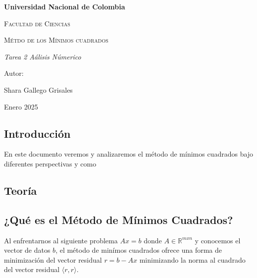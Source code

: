 \documentclass[12pt]{article}
\begin{document}
\begin{titlepage}
\centering
{\bfseries\LARGE Universidad Nacional de Colombia \par}
\vspace{1cm}
{\scshape\Large Facultad de Ciencias \par}
\vspace{3cm}
{\scshape\Huge M\'etdo de los M\'inimos cuadrados\par}
\vspace{3cm}
{\itshape\Large Tarea 2 
A\'alisis N\'umerico\par}
\vfill
{\Large Autor: \par}
{\Large Shara Gallego Grisales \par}
\vfill
{\Large Enero 2025 \par}
\end{titlepage}

\tableofcontents
\vspace{25.0cm}

\begin{center}
\section{Introducci\'on}
\end{center}

\vspace{0.5cm }
En este documento veremos y analizaremos el m\'etodo de m\'inimos cuadrados bajo diferentes perspectivas y como 
\vspace{0.5cm}



\vspace{21cm}




\begin{center}
    \section{Teor\'ia}

\end{center}
\vspace{1.5cm}


\subsection{¿Qu\'e es el M\'etodo de M\'inimos Cuadrados?}\vspace{0.5cm} 

Al enfrentarnos al siguiente problema $Ax=b$ donde $A\in\mathbb{R}^{mxn}$ y  conocemos el vector de datos $b$, el m\'etodo de min\'imos cuadrados ofrece una forma de minimizaci\'on del vector residual $r=b-Ax$ minimizando la norma al cuadrado del vector residual $\langle r,r \rangle$.
\end{document}
